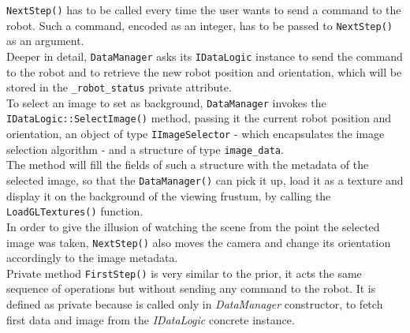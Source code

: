 \texttt{NextStep()} has to be called every time 
the user wants to send a command to the robot.
Such a command, encoded as an integer, has to be passed to 
\texttt{NextStep()} as an argument.
\\
Deeper in detail, \texttt{DataManager} asks its \texttt{IDataLogic} 
instance to send the command to the robot and to 
retrieve the new robot position and orientation, which will be 
stored in the \texttt{\_robot\_status} private attribute.
\\
To select an image to set as background, \texttt{DataManager} 
invokes the \\
\texttt{IDataLogic::SelectImage()} method, 
passing it the current robot position and orientation, 
an object of type \texttt{IImageSelector} - which 
encapsulates the image selection algorithm - and a structure 
of type \texttt{image\_data}.
\\
The method will fill the fields of such a structure with 
the metadata of the selected image, so that the 
\texttt{DataManager()} can pick it up, load it as a 
texture and display it on the background of the 
viewing frustum, by calling the 
\texttt{LoadGLTextures()} function.
\\
In order to give the illusion of watching the scene 
from the point the selected image was taken, 
\texttt{NextStep()} also moves the camera and change 
its orientation accordingly to the image metadata.
\\
Private method \texttt{FirstStep()} is very similar to the
prior, it acts the same sequence of operations but 
without sending any command to the robot. It is defined as private
because is called only in \textit{DataManager} constructor,
to fetch first data and image from the \textit{IDataLogic}
concrete instance.
